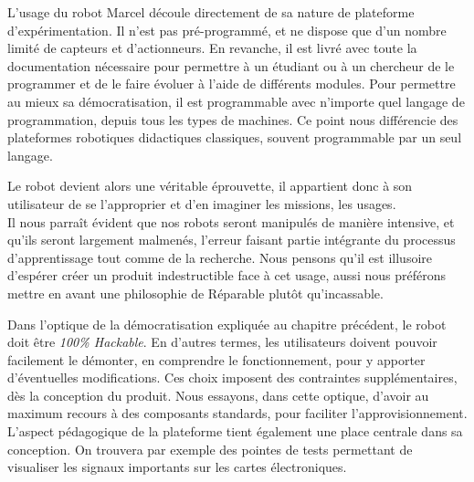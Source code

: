\documentclass[a4paper,12pt]{report}
\begin{document}
L'usage du robot Marcel découle directement de sa nature de plateforme d'expérimentation.
Il n'est pas pré-programmé, et ne dispose que d'un nombre limité de capteurs et d'actionneurs.
En revanche, il est livré avec toute la documentation nécessaire pour permettre à un étudiant ou à un chercheur de le programmer et de le faire évoluer à l'aide de différents modules.
Pour permettre au mieux sa démocratisation, il est programmable avec n'importe quel langage de programmation, depuis tous les types de machines.
Ce point nous différencie des plateformes robotiques didactiques classiques, souvent programmable par un seul langage.

Le robot devient alors une véritable éprouvette, il appartient donc à son utilisateur de se l'approprier et d'en imaginer les missions, les usages.\\

Il nous parraît évident que nos robots seront manipulés de manière intensive, et qu'ils seront largement malmenés, 
l'erreur faisant partie intégrante du processus d'apprentissage tout comme de la recherche.
Nous pensons qu'il est illusoire d'espérer créer un produit indestructible face à cet usage, aussi nous préférons mettre en avant une philosophie de \og{}Réparable plutôt qu'incassable\fg{}.

Dans l'optique de la démocratisation expliquée au chapitre précédent, le robot doit être \emph{100\% Hackable}.
En d'autres termes, les utilisateurs doivent pouvoir facilement le démonter, en comprendre le fonctionnement, pour y apporter d'éventuelles modifications.
Ces choix imposent des contraintes supplémentaires, dès la conception du produit.
Nous essayons, dans cette optique, d'avoir au maximum recours à des composants standards, pour faciliter l'approvisionnement.
L'aspect pédagogique de la plateforme tient également une place centrale dans sa conception.
On trouvera par exemple des pointes de tests permettant de visualiser les signaux importants sur les cartes électroniques.\\
\end{document}
